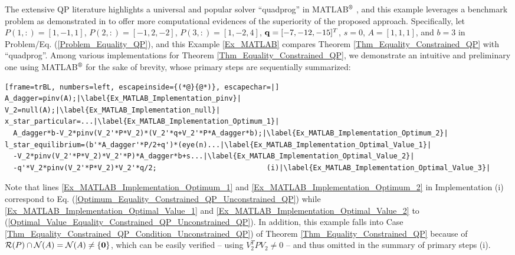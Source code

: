 \documentclass{imaman}
\newcommand{\bfq}{{\bf q}}
\newcommand{\bfzero}{{\bf 0}}
\newcommand{\calN}{{\mathcal N}}
\newcommand{\calR}{{\mathcal R}}
\numberwithin{equation}{section}
\begin{document}
\begin{example}
The extensive QP literature highlights a universal and popular solver ``quadprog'' in MATLAB$\textsuperscript{\textregistered}$ \citep{TsMa:21}, and this example leverages a benchmark problem as demonstrated in \cite{MATLAB} to offer more computational evidences of the superiority of the proposed approach. Specifically, let $P(1,:)=[1,-1,1]$, $P(2,:)=[-1,2,-2]$, $P(3,:)=[1,-2,4]$, $\bfq=[-7,-12,-15]^T$, $s=0$, $A=[1,1,1]$, and $b=3$ in Problem/Eq. (\ref{Problem_Equality_QP}), and this Example \ref{Ex_MATLAB} compares Theorem \ref{Thm_Equality_Constrained_QP} with ``quadprog''. Among various implementations for Theorem \ref{Thm_Equality_Constrained_QP}, we demonstrate an intuitive and preliminary one using MATLAB$\textsuperscript{\textregistered}$ for the sake of brevity, whose primary steps are sequentially summarized:

\vspace{0.2cm}\begin{minipage}{0.95\textwidth}
\begin{lstlisting}[frame=trBL, numbers=left, escapeinside={(*@}{@*)}, escapechar=|]
A_dagger=pinv(A);|\label{Ex_MATLAB_Implementation_pinv}|
V_2=null(A);|\label{Ex_MATLAB_Implementation_null}|
x_star_particular=...|\label{Ex_MATLAB_Implementation_Optimum_1}|
  A_dagger*b-V_2*pinv(V_2'*P*V_2)*(V_2'*q+V_2'*P*A_dagger*b);|\label{Ex_MATLAB_Implementation_Optimum_2}|
l_star_equilibrium=(b'*A_dagger'*P/2+q')*(eye(n)...|\label{Ex_MATLAB_Implementation_Optimal_Value_1}|
  -V_2*pinv(V_2'*P*V_2)*V_2'*P)*A_dagger*b+s...|\label{Ex_MATLAB_Implementation_Optimal_Value_2}|
  -q'*V_2*pinv(V_2'*P*V_2)*V_2'*q/2;                          (i)|\label{Ex_MATLAB_Implementation_Optimal_Value_3}|
\end{lstlisting}
\end{minipage}

\noindent Note that lines \ref{Ex_MATLAB_Implementation_Optimum_1} and \ref{Ex_MATLAB_Implementation_Optimum_2} in Implementation (i) correspond to Eq. (\ref{Optimum_Equality_Constrained_QP_Unconstrained_QP}) while \ref{Ex_MATLAB_Implementation_Optimal_Value_1} and \ref{Ex_MATLAB_Implementation_Optimal_Value_2} to (\ref{Optimal_Value_Equality_Constrained_QP_Unconstrained_QP}). In addition, this example falls into Case \ref{Thm_Equality_Constrained_QP_Condition_Unconstrained_QP}) of Theorem \ref{Thm_Equality_Constrained_QP} because of $\calR(P)\cap\calN(A)=\calN(A)\ne\{\bfzero\}$, which can be easily verified -- using $V_2^TPV_2\ne 0$ -- and thus omitted in the summary of primary steps (i).


\end{example}
\end{document}
